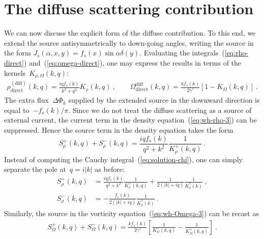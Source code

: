 \documentclass[preprint,aps,eqsecnum]{revtex4-1}
\newcommand{\fplus}[1]{{#1}^{+}}
\newcommand{\fminus}[1]{{#1}^{-}}
\newcommand{\dct}[1]{{#1}_\mathrm{direct}}
\begin{document}
\section{The diffuse scattering contribution}
\label{sec:diffuse}

We can now discuss the explicit form of the diffuse contribution.
To this end, we extend the source antisymmetrically to down-going angles,
writing the source in the form
$J_{s}(\alpha, x, y) =  f_s(x) \sin\alpha \delta(y)$.
Evaluating the integrals~(\ref{eq:rho-direct}) and~(\ref{eq:omega-direct}),
one may express the results in terms of the kernels~$K_{\rho, \Omega}(k, q)$:
\begin{align}
\dct{\rho}^\mathrm{(diff)}(k, q) = \frac{iq f_s(k)}{k^2 + q^2} K_\rho(k, q)\ ,
\qquad
\dct{\Omega}^\mathrm{diff}(k, q) = \frac{k f_s(k)}{2\gamma'} \left[1 - K_\Omega(k, q)\right] \ . 
\end{align}
The extra flux~$\Delta\Phi_{k}$
supplied by the extended source in the downward direction
is equal to~$-f_s(k)/\pi$. 
Since we do not treat the diffuse scattering as a source of external current,
the current term in the density equation~(\ref{eq:wh-rho-3}) can
be suppressed.
Hence the source term in the density equation takes the form
\begin{equation}
  \fplus{S}_\rho(k, q) + \fminus{S}_\rho(k, q) =
  \frac{iq f_s(k)}{q^2 + k^2} \frac{1}{\fplus{K}_\rho(k, q)}\ . 
\end{equation}
Instead of computing the Cauchy integral~(\ref{eq:solution-chi}),
one can simply separate the pole at~$q = i|k|$ as before:
\begin{align}
  \fplus{S}_\rho(k, q) &= \frac{iq f_s(k)}{q^2 + k^2}
  \frac{1}{\fplus{K}_\rho(k, q)}
  + \frac{1}{2(|k| + iq)} \frac{1}{K_\rho^\ast(k)}\ , \\
  \fminus{S}_\rho(k, q) &= - \frac{f_s(k)}{2(|k| + iq)}
                          \frac{1}{K_\rho^\ast(k)}
  \ . 
\end{align}
Similarly, the source in the vorticity equation~(\ref{eq:wh-Omega-3}) can be
recast as
\begin{align}
  \fplus{S}_\Omega(k, q) + \fminus{S}_\Omega(k, q) =
  \frac{k f_s(k)}{2\gamma'} \left[\frac{1}{\fminus{K}_\Omega(k, q)}
  - \frac{1}{\fplus{K}_\Omega(k, q)} \right]\ . 
\end{align}
\end{document}
